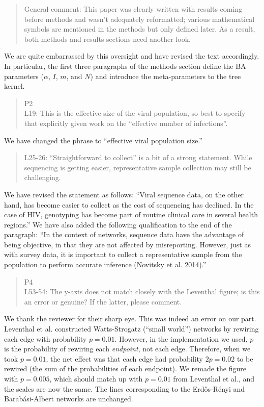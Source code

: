 \documentclass[12pt]{letter}
\begin{document}
\begin{letter}{ }
\begin{quote}
  General comment: This paper was clearly written with results coming before
  methods and wasn't adequately reformatted; various mathematical symbols are
  mentioned in the methods but only defined later. As a result, both methods
  and results sections need another look.
\end{quote}

We are quite embarrassed by this oversight and have revised the text
accordingly. In particular, the first three paragraphs of the methods section
define the BA parameters ($\alpha$, $I$, $m$, and $N$) and introduce the
meta-parameters to the tree kernel.

\begin{quote}
  \itshape

  P2 \\
  L19: This is the effective size of the viral population, so best to specify
  that explicitly given work on the ``effective number of infections''.
\end{quote}

We have changed the phrase to ``effective viral population size.''

\begin{quote}
  \itshape

  L25-26: ``Straightforward to collect'' is a bit of a strong statement. While
  sequencing is getting easier, representative sample collection may still be
  challenging.
\end{quote}

We have revised the statement as follows: ``Viral sequence data, on the other
hand, has become easier to collect as the cost of sequencing has declined. In
the case of HIV, genotyping has become part of routine clinical care in several
health regions.'' We have also added the following qualification to the end of
the paragraph: ``In the context of networks, sequence data have the advantage
of being objective, in that they are not affected by misreporting. However,
just as with survey data, it is important to collect a representative sample
from the population to perform accurate inference (Novitsky et al. 2014).''

\begin{quote}
  \itshape

  P4\\
  L53-54: The y-axis does not match closely with the Leventhal figure; is this
  an error or genuine? If the latter, please comment.
\end{quote}

We thank the reviewer for their sharp eye. This was indeed an error on our
part. Leventhal et al. constructed Watts-Strogatz (``small world'') networks by
rewiring each edge with probability $p = 0.01$. However, in the implementation
we used, $p$ is the probability of rewiring each \emph{endpoint}, not each
edge. Therefore, when we took $p = 0.01$, the net effect was that each edge had
probability $2p = 0.02$ to be rewired (the sum of the probabilities of each
endpoint). We remade the figure with $p = 0.005$, which should match up with $p
= 0.01$ from Leventhal et al., and the scales are now the same. The lines
corresponding to the Erd\H{o}s-R\'enyi and Barab\'asi-Albert networks are
unchanged.


\end{letter}
\end{document}
